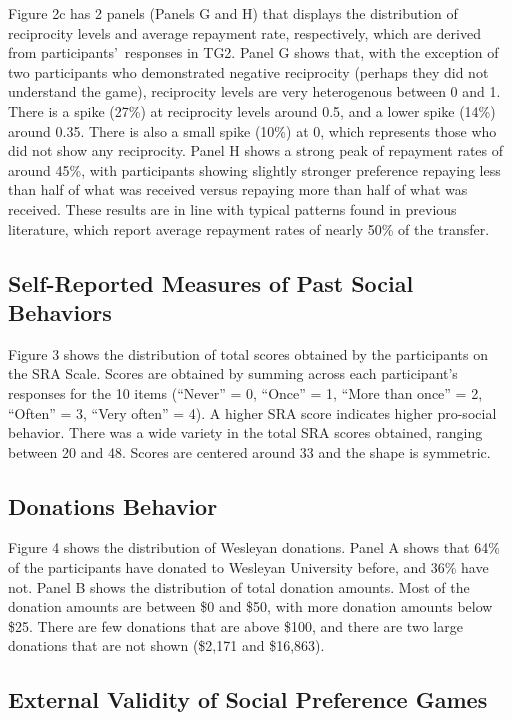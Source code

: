 \documentclass[12pt]{article}
\begin{document}
{\color{green}Figure 2c} has 2 panels (Panels G and H) that displays the distribution of reciprocity levels and average repayment rate, respectively, which are derived from participants\rq \ responses in TG2. Panel G shows that, with the exception of two participants who demonstrated negative reciprocity (perhaps they did not understand the game), reciprocity levels are very heterogenous between 0 and 1. There is a spike (27\%) at reciprocity levels around 0.5, and a lower spike (14\%) around 0.35. There is also a small spike (10\%) at 0, which represents those who did not show any reciprocity. Panel H shows a strong peak of repayment rates of around 45\%, with participants showing slightly stronger preference repaying less than half of what was received versus repaying more than half of what was received. These results are in line with typical patterns found in previous literature, which report average repayment rates of nearly 50\% of the transfer.


\subsection{Self-Reported Measures of Past Social Behaviors}

{\color{green}Figure 3} shows the distribution of total scores obtained by the participants on the SRA Scale. Scores are obtained by summing across each participant\rq s responses for the 10 items (``Never'' = 0, ``Once'' = 1, ``More than once'' = 2, ``Often'' = 3, ``Very often'' = 4). A higher SRA score indicates higher pro-social behavior. There was a wide variety in the total SRA scores obtained, ranging between 20 and 48. Scores are centered around 33 and the shape is symmetric.

\subsection{Donations Behavior}

{\color{green}Figure 4} shows the distribution of Wesleyan donations. Panel A shows that 64\% of the participants have donated to Wesleyan University before, and 36\% have not. Panel B shows the distribution of total donation amounts. Most of the donation amounts are between \$0 and \$50, with more donation amounts below \$25. There are few donations that are above \$100, and there are two large donations that are not shown (\$2,171 and \$16,863). 

\subsection{External Validity of Social Preference Games}
\end{document}
